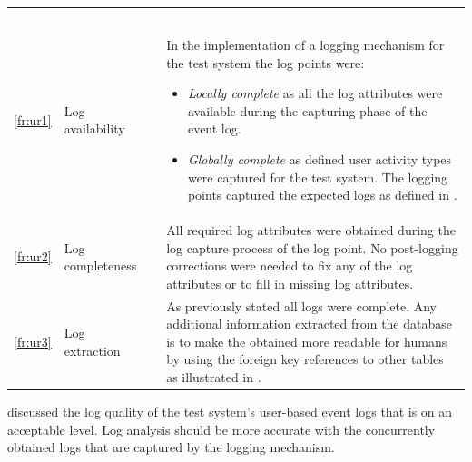 \begin{xltabular}{\textwidth}{clcX}
	\caption[Logging quality assessment of the test system]{\textit{Logging quality assessment of the test system}}\label{tbl:ch3_testLoggingQuality}\\
	\toprule
	 &  &  &  \\
	\midrule
	\endfirsthead

	\caption[]{\continueCaption} \\
	\toprule
	 &  &  &  \\
	\midrule
	\endhead

	\midrule
	 \\ 
	\endfoot
	\endlastfoot

	\ref{fr:ur1} & Log availability & \cmark & \RaggedRight In the implementation of a logging mechanism for the test system the log points were:
		\begin{itemize}
			\item \textit{Locally complete} as all the log attributes were available during the capturing phase of the event log.
			\item \textit{Globally complete} as defined user activity types were captured for the test system. The logging points captured the expected logs as defined in .
		\end{itemize} \\
	\ref{fr:ur2} & Log completeness & \cmark & All required log attributes were obtained during the log capture process of the log point. No post-logging corrections were needed to fix any of the log attributes or to fill in missing log attributes. \\
	\ref{fr:ur3} & Log extraction & \cmark & As previously stated all logs were complete. Any additional information extracted from the database is to make the obtained more readable for humans by using the foreign key references to other tables as illustrated in . \\
	\bottomrule
\end{xltabular}

 discussed the log quality of the test system's user-based event logs that is on an acceptable level. Log analysis should be more accurate with the concurrently obtained logs that are captured by the logging mechanism.

